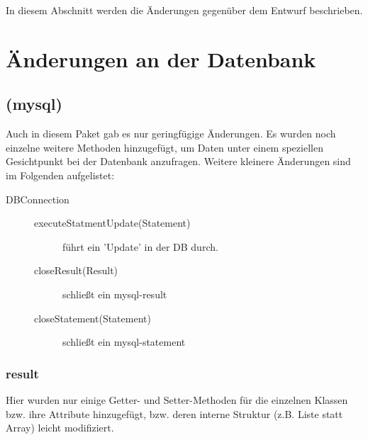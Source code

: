In diesem Abschnitt werden die Änderungen gegenüber dem Entwurf beschrieben.
\section{Änderungen an der Datenbank}
	  \subsection{(mysql)}
	Auch in diesem Paket gab es nur geringfügige Änderungen. Es wurden noch einzelne weitere Methoden hinzugefügt, um Daten unter einem speziellen Gesichtpunkt bei der Datenbank anzufragen. Weitere kleinere Änderungen sind im Folgenden aufgelistet:
	\begin{description}
		\item [DBConnection] 
		\begin{description}
			\item[executeStatmentUpdate(Statement)] führt ein 'Update' in der DB durch.
			\item[closeResult(Result)] schließt ein mysql-result
			\item[closeStatement(Statement)] schließt ein mysql-statement
		\end{description}
	\end{description}
	
	\subsubsection{result}
	Hier wurden nur einige Getter- und Setter-Methoden für die einzelnen Klassen bzw. ihre Attribute hinzugefügt, bzw. deren interne Struktur (z.B. Liste statt Array) leicht modifiziert.

